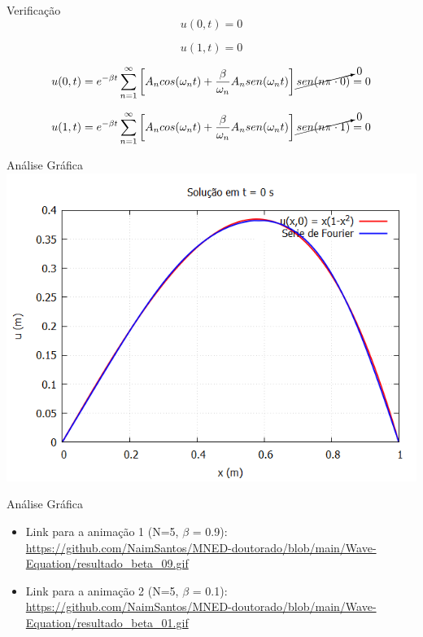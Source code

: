 \documentclass{beamer}
\begin{document}
\begin{frame}{Verificação}
\begin{equation*}
    u\left ( 0, t \right ) = 0 
\end{equation*}

\begin{equation*}
    u\left ( 1, t \right ) = 0
\end{equation*}


\begin{equation*}
    u(0, t) = e^{-\beta t}\sum_{n=1}^{\infty}\left [A_n cos (\omega_n t) + \dfrac{\beta}{\omega_n}A_n sen (\omega_n t)\right ] \cancelto{0}{sen (n \pi \cdot 0)} = 0
\end{equation*}

\begin{equation*}
    u(1, t) = e^{-\beta t}\sum_{n=1}^{\infty}\left [A_n cos (\omega_n t) + \dfrac{\beta}{\omega_n}A_n sen (\omega_n t)\right ] \cancelto{0}{sen (n \pi \cdot 1)} = 0
\end{equation*}

\end{frame}
\begin{center}

\begin{frame}{Análise Gráfica}
    \includegraphics[scale=0.45]{Resultado.png}
\end{frame}

\end{center}

\begin{frame}{Análise Gráfica}
    
\begin{itemize}
    \item Link para a animação 1 (N=5, $\beta$ = 0.9):  \url{https://github.com/NaimSantos/MNED-doutorado/blob/main/Wave-Equation/resultado_beta_09.gif}
    \item Link para a animação 2 (N=5, $\beta$ = 0.1):  \url{https://github.com/NaimSantos/MNED-doutorado/blob/main/Wave-Equation/resultado_beta_01.gif}
\end{itemize}
\end{frame}

\end{document}
